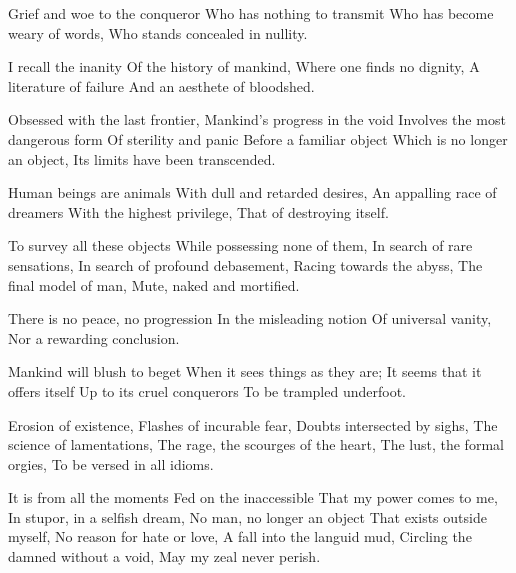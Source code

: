 \documentclass{article}
\newenvironment{stanza}{\begin{minipage}{10cm}\begin{internallinenumbers}\obeylines}{\end{internallinenumbers}\end{minipage}\vspace{\baselineskip}}
\begin{document}
\begin{stanza}
Grief and woe to the conqueror
Who has nothing to transmit
Who has become weary of words,
Who stands concealed in nullity.
\end{stanza}

\begin{stanza}
I recall the inanity
Of the history of mankind,
Where one finds no dignity,
A literature of failure
And an aesthete of bloodshed.
\end{stanza}

\begin{stanza}
Obsessed with the last frontier,
Mankind's progress in the void
Involves the most dangerous form
Of sterility and panic
Before a familiar object 
Which is no longer an object,
Its limits have been transcended.
\end{stanza}

\begin{stanza}
Human beings are animals
With dull and retarded desires,
An appalling race of dreamers
With the highest privilege,
That of destroying itself.
\end{stanza}

\begin{stanza}
To survey all these objects
While possessing none of them,
In search of rare sensations,
In search of profound debasement,
Racing towards the abyss,
The final model of man,
Mute, naked and mortified.
\end{stanza}

\begin{stanza}
There is no peace, no progression
In the misleading notion
Of universal vanity,
Nor a rewarding conclusion.
\end{stanza}

\begin{stanza}
Mankind will blush to beget
When it sees things as they are;
It seems that it offers itself
Up to its cruel conquerors
To be trampled underfoot.
\end{stanza}

\begin{stanza}
Erosion of existence,
Flashes of incurable fear,
Doubts intersected by sighs,
The science of lamentations,
The rage, the scourges of the heart,
The lust, the formal orgies,
To be versed in all idioms.
\end{stanza}

\begin{stanza}
It is from all the moments
Fed on the inaccessible
That my power comes to me,
In stupor, in a selfish dream,
No man, no longer an object
That exists outside myself,
No reason for hate or love,
A fall into the languid mud,
Circling the damned without a void,
May my zeal never perish.
\end{stanza}
\end{document}

